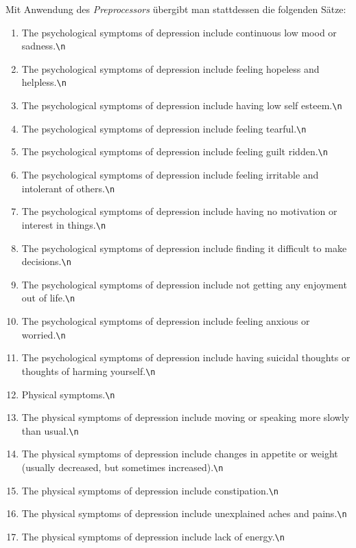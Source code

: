 Mit Anwendung des \emph{Preprocessors} übergibt man stattdessen die folgenden Sätze:
\begin{enumerate}
	\item \glqq The psychological symptoms of depression include continuous low mood or sadness.\verb!\n!\grqq
	\item \glqq The psychological symptoms of depression include feeling hopeless and helpless.\verb!\n!\grqq
	\item \glqq The psychological symptoms of depression include having low self esteem.\verb!\n!\grqq
	\item \glqq The psychological symptoms of depression include feeling tearful.\verb!\n!\grqq
	\item \glqq The psychological symptoms of depression include feeling guilt ridden.\verb!\n!\grqq
	\item \glqq The psychological symptoms of depression include feeling irritable and intolerant of others.\verb!\n!\grqq
	\item \glqq The psychological symptoms of depression include having no motivation or interest in things.\verb!\n!\grqq
	\item \glqq The psychological symptoms of depression include finding it difficult to make decisions.\verb!\n!\grqq
	\item \glqq The psychological symptoms of depression include not getting any enjoyment out of life.\verb!\n!\grqq
	\item \glqq The psychological symptoms of depression include feeling anxious or worried.\verb!\n!\grqq
	\item \glqq The psychological symptoms of depression include having suicidal thoughts or thoughts of harming yourself.\verb!\n!\grqq
	\item \glqq Physical symptoms.\verb!\n!\grqq
	\item \glqq The physical symptoms of depression include moving or speaking more slowly than usual.\verb!\n!\grqq
	\item \glqq The physical symptoms of depression include changes in appetite or weight (usually decreased, but sometimes increased).\verb!\n!\grqq
	\item \glqq The physical symptoms of depression include constipation.\verb!\n!\grqq
	\item \glqq The physical symptoms of depression include unexplained aches and pains.\verb!\n!\grqq
	\item \glqq The physical symptoms of depression include lack of energy.\verb!\n!\grqq

\end{enumerate}
